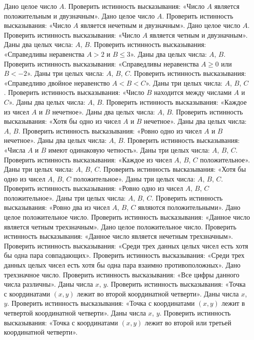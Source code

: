 Дано целое число $A$. Проверить истинность высказывания: «Число $A$ является положительным и двузначным».
Дано целое число $A$. Проверить истинность высказывания: «Число $A$ является нечетным и двузначным».
Дано целое число $A$. Проверить истинность высказывания: «Число $A$ является четным и двузначным».
Даны два целых числа: $A$, $B$. Проверить истинность высказывания: «Справедливы неравенства $A > 2$ и $B \leq 3$».
Даны два целых числа: $A$, $B$. Проверить истинность высказывания: «Справедливы неравенства $A \geq 0$ или $B < -2$».
Даны три целых числа: $A$, $B$, $C$. Проверить истинность высказывания: «Справедливо двойное неравенство $A < B < C$».
Даны три целых числа: $A$, $B$, $C$. Проверить истинность высказывания: «Число $B$ находится между числами $A$ и $C$».
Даны два целых числа: $A$, $B$. Проверить истинность высказывания: «Каждое из чисел $A$ и $B$ нечетное».
Даны два целых числа: $A$, $B$. Проверить истинность высказывания: «Хотя бы одно из чисел $A$ и $B$ нечетное».
Даны два целых числа: $A$, $B$. Проверить истинность высказывания: «Ровно одно из чисел $A$ и $B$ нечетное».
Даны два целых числа: $A$, $B$. Проверить истинность высказывания: «Числа $A$ и $B$ имеют одинаковую четность».
Даны три целых числа: $A$, $B$, $C$. Проверить истинность высказывания: «Каждое из чисел $A$, $B$, $C$ положительное».
Даны три целых числа: $A$, $B$, $C$. Проверить истинность высказывания: «Хотя бы одно из чисел $A$, $B$, $C$ положительное».
Даны три целых числа: $A$, $B$, $C$. Проверить истинность высказывания: «Ровно одно из чисел $A$, $B$, $C$ положительное».
Даны три целых числа: $A$, $B$, $C$. Проверить истинность высказывания: «Ровно два из чисел $A$, $B$, $C$ являются положительными».
Дано целое положительное число. Проверить истинность высказывания: «Данное число является четным трехзначным».
Дано целое положительное число. Проверить истинность высказывания: «Данное число является нечетным трехзначным».
Проверить истинность высказывания: «Среди трех данных целых чисел есть хотя бы одна пара совпадающих».
Проверить истинность высказывания: «Среди трех данных целых чисел есть хотя бы одна пара взаимно противоположных».
Дано трехзначное число. Проверить истинность высказывания: «Все цифры данного числа различны».
Даны числа $x$, $y$. Проверить истинность высказывания: «Точка с координатами $(x, y)$ лежит во второй координатной четверти».
Даны числа $x$, $y$. Проверить истинность высказывания: «Точка с координатами $(x, y)$ лежит в четвертой координатной четверти».
Даны числа $x$, $y$. Проверить истинность высказывания: «Точка с координатами $(x, y)$ лежит во второй или третьей координатной четверти».
